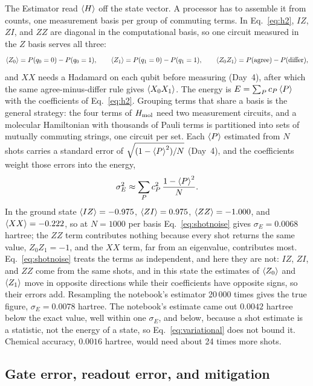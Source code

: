 \documentclass[11pt]{article}
\begin{document}
The Estimator read $\braket{H}$ off the state vector. A processor has to assemble it from counts, one measurement basis per group of commuting terms. In Eq.~\eqref{eq:h2}, $IZ$, $ZI$, and $ZZ$ are diagonal in the computational basis, so one circuit measured in the $Z$ basis serves all three:
\begin{equation}
\braket{Z_0} = P(q_0 = 0) - P(q_0 = 1),\qquad \braket{Z_1} = P(q_1 = 0) - P(q_1 = 1),\qquad \braket{Z_0Z_1} = P(\text{agree}) - P(\text{differ}),
\label{eq:zterms}
\end{equation}
and $XX$ needs a Hadamard on each qubit before measuring (Day~4), after which the same agree-minus-differ rule gives $\braket{X_0X_1}$. The energy is $E = \sum_P c_P\braket{P}$ with the coefficients of Eq.~\eqref{eq:h2}. Grouping terms that share a basis is the general strategy: the four terms of $H_{\rm mol}$ need two measurement circuits, and a molecular Hamiltonian with thousands of Pauli terms is partitioned into sets of mutually commuting strings, one circuit per set. Each $\braket{P}$ estimated from $N$ shots carries a standard error of $\sqrt{(1 - \braket{P}^2)/N}$ (Day~4), and the coefficients weight those errors into the energy,
\begin{equation}
\sigma_E^2 \approx \sum_P c_P^2\,\frac{1 - \braket{P}^2}{N} .
\label{eq:shotnoise}
\end{equation}
In the ground state $\braket{IZ} = -0.975$, $\braket{ZI} = 0.975$, $\braket{ZZ} = -1.000$, and $\braket{XX} = -0.222$, so at $N = 1000$ per basis Eq.~\eqref{eq:shotnoise} gives $\sigma_E = 0.0068$ hartree; the $ZZ$ term contributes nothing because every shot returns the same value, $Z_0Z_1 = -1$, and the $XX$ term, far from an eigenvalue, contributes most. Eq.~\eqref{eq:shotnoise} treats the terms as independent, and here they are not: $IZ$, $ZI$, and $ZZ$ come from the same shots, and in this state the estimates of $\braket{Z_0}$ and $\braket{Z_1}$ move in opposite directions while their coefficients have opposite signs, so their errors add. Resampling the notebook's estimator 20\,000 times gives the true figure, $\sigma_E = 0.0078$ hartree. The notebook's estimate came out $0.0042$ hartree below the exact value, well within one $\sigma_E$, and below, because a shot estimate is a statistic, not the energy of a state, so Eq.~\eqref{eq:variational} does not bound it. Chemical accuracy, $0.0016$ hartree, would need about 24 times more shots.

\subsection{Gate error, readout error, and mitigation}
\end{document}

